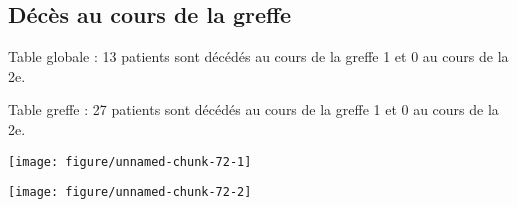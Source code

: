 \documentclass[11pt,a4paper]{article}\usepackage[]{graphicx}\usepackage[]{color}
\makeatletter
\def\maxwidth{ %
  \ifdim\Gin@nat@width>\linewidth
    \linewidth
  \else
    \Gin@nat@width
  \fi
}
\newenvironment{knitrout}{}{} %
\makeatother
\begin{document}
  \subsection{Décès au cours de la greffe}

Table globale : 13 patients sont décédés au cours de la greffe 1 et 0 au cours de la 2e.

Table greffe : 27 patients sont décédés au cours de la greffe 1 et 0 au cours de la 2e.

\begin{knitrout}
\color{fgcolor}
\texttt{[image: figure/unnamed-chunk-72-1]} 

\texttt{[image: figure/unnamed-chunk-72-2]} 

\end{knitrout}
\end{document}
